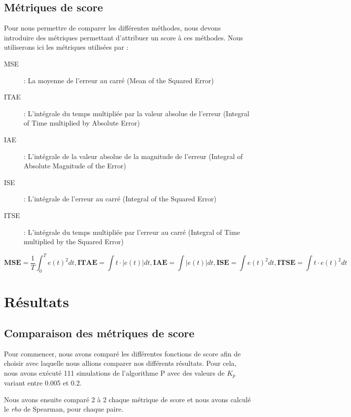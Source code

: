 \documentclass[a4paper,10pt]{report}
\begin{document}
\subsection{Métriques de score}
\label{section:metrics}
Pour nous permettre de comparer les différentes méthodes, nous devons introduire des métriques permettant d'attribuer un score à ces méthodes.
Nous utiliserons ici les métriques utilisées par \cite{griffin2003line, mirzal2012pid} :
\begin{description}
    \item[MSE] : La moyenne de l'erreur au carré (Mean of the Squared Error)
    \item[ITAE] : L'intégrale du temps multipliée par la valeur absolue de l'erreur  (Integral of Time multiplied by Absolute Error)
    \item[IAE] : L'intégrale de la valeur absolue de la magnitude de l'erreur (Integral of Absolute Magnitude of the Error)
    \item[ISE] : L'intégrale de l'erreur au carré (Integral of the Squared Error)
    \item[ITSE] : L'intégrale du temps multipliée par l'erreur au carré (Integral of Time multiplied by the Squared Error)
\end{description}

$$
\textbf{MSE} = \frac{1}{T} \int_0^T e(t)^2 dt,
\textbf{ITAE} = \int t \cdot |e(t)| dt,
\textbf{IAE} = \int |e(t)| dt,
\textbf{ISE} = \int e(t)^2 dt,
\textbf{ITSE} = \int t \cdot e(t)^2 dt
$$


\section{Résultats}

\subsection{Comparaison des métriques de score}

Pour commencer, nous avons comparé les différentes fonctions de score afin de choisir avec laquelle nous allions comparer nos différents résultats. Pour cela, nous avons exécuté 111 simulations de l'algorithme P avec des valeurs de $K_p$ variant entre 0.005 et 0.2.

Nous avons ensuite comparé 2 à 2 chaque métrique de score et nous avons calculé le \textit{rho} de Spearman, pour chaque paire.

\end{document}
